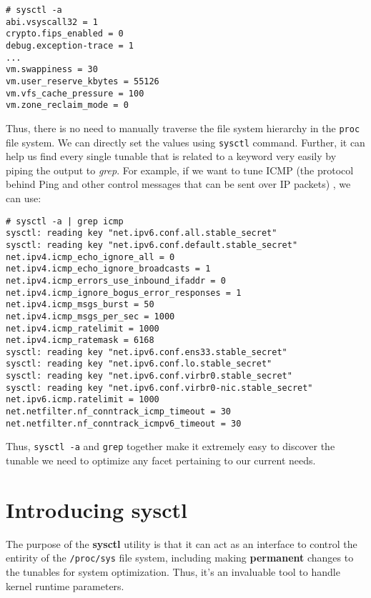 \vspace{-15pt}
\begin{verbatim}
# sysctl -a
abi.vsyscall32 = 1
crypto.fips_enabled = 0
debug.exception-trace = 1
...
vm.swappiness = 30
vm.user_reserve_kbytes = 55126
vm.vfs_cache_pressure = 100
vm.zone_reclaim_mode = 0
\end{verbatim}
\vspace{-10pt}	

\noindent
Thus, there is no need to manually traverse the file system hierarchy in the \verb|proc| file system. We can directly set the values using \verb|sysctl| command. Further, it can help us find every single tunable that is related to a keyword very easily by piping the output to \textit{grep}. For example, if we want to tune ICMP (the protocol behind Ping and other control messages that can be sent over IP packets) , we can use:

\vspace{-15pt}
\begin{verbatim}
# sysctl -a | grep icmp
sysctl: reading key "net.ipv6.conf.all.stable_secret"
sysctl: reading key "net.ipv6.conf.default.stable_secret"
net.ipv4.icmp_echo_ignore_all = 0
net.ipv4.icmp_echo_ignore_broadcasts = 1
net.ipv4.icmp_errors_use_inbound_ifaddr = 0
net.ipv4.icmp_ignore_bogus_error_responses = 1
net.ipv4.icmp_msgs_burst = 50
net.ipv4.icmp_msgs_per_sec = 1000
net.ipv4.icmp_ratelimit = 1000
net.ipv4.icmp_ratemask = 6168
sysctl: reading key "net.ipv6.conf.ens33.stable_secret"
sysctl: reading key "net.ipv6.conf.lo.stable_secret"
sysctl: reading key "net.ipv6.conf.virbr0.stable_secret"
sysctl: reading key "net.ipv6.conf.virbr0-nic.stable_secret"
net.ipv6.icmp.ratelimit = 1000
net.netfilter.nf_conntrack_icmp_timeout = 30
net.netfilter.nf_conntrack_icmpv6_timeout = 30
\end{verbatim}
\vspace{-10pt}	

\noindent
Thus, \verb|sysctl -a| and \verb|grep| together make it extremely easy to discover the tunable we need to optimize any facet pertaining to our current needs. 

\section{Introducing sysctl}
The purpose of the \textbf{sysctl} utility is that it can act as an interface to control the entirity of the \verb|/proc/sys| file system, including making \textbf{permanent} changes to the tunables for system optimization. Thus, it's an invaluable tool to handle kernel runtime parameters. 

